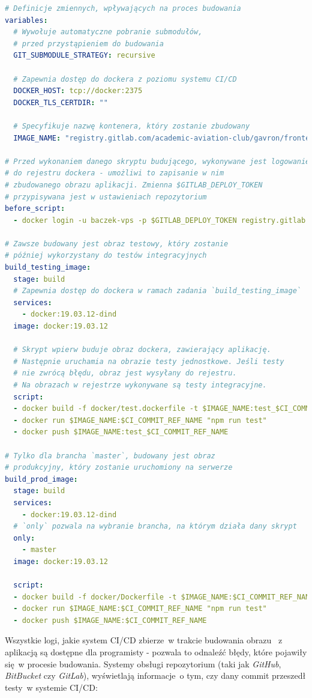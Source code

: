 \begin{lstlisting}[language=yml, label=list:ci_cd_frontend,caption={Plik konfiguracyjny \textit{Gitlab CI}, budujący aplikację kliencką }, basicstyle=\footnotesize\ttfamily]
# Definicje zmiennych, wpływających na proces budowania
variables:
  # Wywołuje automatyczne pobranie submodułów,
  # przed przystąpieniem do budowania 
  GIT_SUBMODULE_STRATEGY: recursive
 
  # Zapewnia dostęp do dockera z poziomu systemu CI/CD
  DOCKER_HOST: tcp://docker:2375
  DOCKER_TLS_CERTDIR: "" 

  # Specyfikuje nazwę kontenera, który zostanie zbudowany 
  IMAGE_NAME: "registry.gitlab.com/academic-aviation-club/gavron/frontend"

# Przed wykonaniem danego skryptu budującego, wykonywane jest logowanie
# do rejestru dockera - umożliwi to zapisanie w nim 
# zbudowanego obrazu aplikacji. Zmienna $GITLAB_DEPLOY_TOKEN
# przypisywana jest w ustawieniach repozytorium
before_script:
  - docker login -u baczek-vps -p $GITLAB_DEPLOY_TOKEN registry.gitlab.com

# Zawsze budowany jest obraz testowy, który zostanie
# później wykorzystany do testów integracyjnych
build_testing_image:
  stage: build
  # Zapewnia dostęp do dockera w ramach zadania `build_testing_image`
  services:
    - docker:19.03.12-dind
  image: docker:19.03.12
  
  # Skrypt wpierw buduje obraz dockera, zawierający aplikację.
  # Następnie uruchamia na obrazie testy jednostkowe. Jeśli testy
  # nie zwrócą błędu, obraz jest wysyłany do rejestru.
  # Na obrazach w rejestrze wykonywane są testy integracyjne.
  script:
  - docker build -f docker/test.dockerfile -t $IMAGE_NAME:test_$CI_COMMIT_REF_NAME .
  - docker run $IMAGE_NAME:$CI_COMMIT_REF_NAME "npm run test"
  - docker push $IMAGE_NAME:test_$CI_COMMIT_REF_NAME

# Tylko dla brancha `master`, budowany jest obraz 
# produkcyjny, który zostanie uruchomiony na serwerze
build_prod_image:
  stage: build
  services:
	- docker:19.03.12-dind	
  # `only` pozwala na wybranie brancha, na którym działa dany skrypt
  only:
    - master
  image: docker:19.03.12
   
  script:
  - docker build -f docker/Dockerfile -t $IMAGE_NAME:$CI_COMMIT_REF_NAME .
  - docker run $IMAGE_NAME:$CI_COMMIT_REF_NAME "npm run test"
  - docker push $IMAGE_NAME:$CI_COMMIT_REF_NAME
\end{lstlisting}

Wszystkie logi, jakie system CI/CD zbierze~w trakcie budowania obrazu ~z aplikacją są dostępne dla programisty - pozwala to odnaleźć błędy,
które pojawiły się~w procesie budowania. Systemy obsługi repozytorium
(taki jak \textit{GitHub}, \textit{BitBucket} czy \textit{GitLab}),
wyświetlają informacje~o tym, czy dany commit przeszedł testy~w systemie CI/CD:

